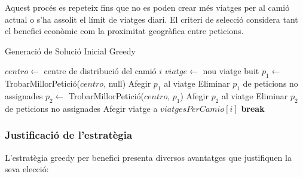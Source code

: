 Aquest procés es repeteix fins que no es poden crear més viatges per al camió actual o s'ha assolit el límit de viatges diari. El criteri de selecció considera tant el benefici econòmic com la proximitat geogràfica entre peticions.

\begin{algorithm}[H]
\caption{Generació de Solució Inicial Greedy}
\begin{algorithmic}[1]
        \State $centro \gets$ centre de distribució del camió $i$
            \State $viatge \gets$ nou viatge buit
            \State $p_1 \gets$ TrobarMillorPetició($centro$, null)
                \State Afegir $p_1$ al viatge
                \State Eliminar $p_1$ de peticions no assignades
                \State $p_2 \gets$ TrobarMillorPetició($centro$, $p_1$)
                    \State Afegir $p_2$ al viatge
                    \State Eliminar $p_2$ de peticions no assignades
                \EndIf
                \State Afegir viatge a $viatgesPerCamio[i]$
            \Else
                \State \textbf{break} 
            \EndIf
        \EndFor
    \EndFor
\EndProcedure
\end{algorithmic}
\end{algorithm}

\vspace{0.5cm}

\subsubsection{Justificació de l'estratègia}

L'estratègia greedy per benefici presenta diversos avantatges que justifiquen la seva elecció:

